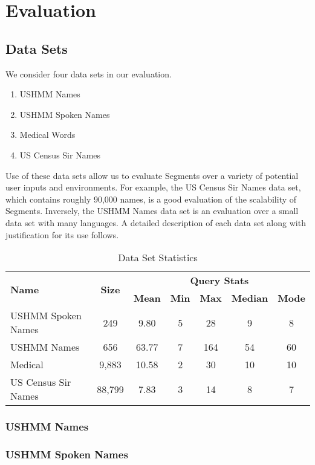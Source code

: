 \documentclass{article}
\begin{document}
\section{Evaluation} %
\label{sec:evaluation}

\subsection{Data Sets} %
\label{sub:data_sets}
We consider four data sets in our evaluation.

\begin{enumerate}
	\item USHMM Names
	\item USHMM Spoken Names
	\item Medical Words
	\item US Census Sir Names
\end{enumerate}

Use of these data sets allow us to evaluate Segments over a variety of potential user inputs and environments.  For example, the US Census Sir Names data set, which contains roughly 90,000 names, is a good evaluation of the scalability of Segments.  Inversely, the USHMM Names data set is an evaluation over a small data set with many languages.  A detailed description of each data set along with justification for its use follows.


\begin{table}
	\centering
	\caption{Data Set Statistics}
	\begin{tabular}{|l|c|c|c|c|c|c|}
		\hline
		\multirow{2}{*}{\textbf{Name}} & \multirow{2}{*}{\textbf{Size}} & \multicolumn{5}{|c|}{\textbf{Query Stats}}\\
		\cline{3-7}
		  & & \textbf{Mean} & \textbf{Min} & \textbf{Max} & \textbf{Median} & \textbf{Mode} \\
		\hline
		USHMM Spoken Names & 249 & 9.80 & 5 & 28 & 9 & 8 \\
		USHMM Names & 656 & 63.77 & 7 & 164 & 54 & 60 \\
		Medical & 9,883 & 10.58 & 2 & 30 & 10 & 10 \\
		US Census Sir Names & 88,799 & 7.83 & 3 & 14 & 8 & 7 \\
		\hline
	\end{tabular}
	\label{tab:query_performance}
\end{table}

\subsubsection{USHMM Names} %
\label{ssub:ushmm_names}




\subsubsection{USHMM Spoken Names} %
\label{ssub:ushmm_spoken_names}



\end{document}
